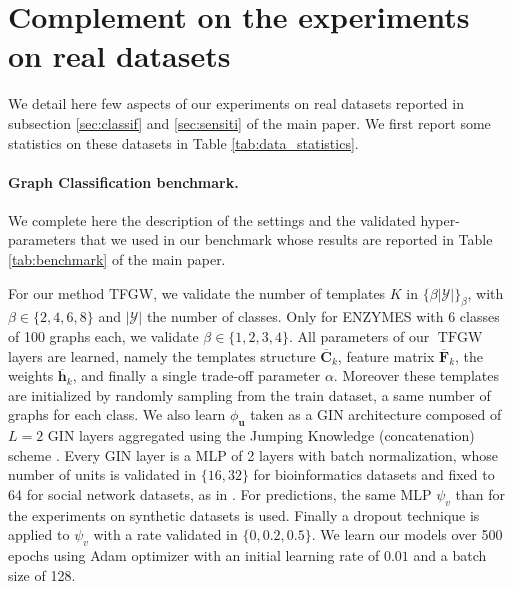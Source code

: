 \documentclass{article}
\def\vh{{\bm{h}}}
\def\vu{{\bm{u}}}
\def\mC{{\bm{C}}}
\def\mF{{\bm{F}}}
\newcommand{\TFGW}{\operatorname{TFGW}}
\begin{document}
{\section{Complement on the experiments on real datasets}
We detail here few aspects of our experiments on real datasets reported in subsection \ref{sec:classif} and \ref{sec:sensiti} of the main paper. We first report some statistics on these datasets in Table \ref{tab:data_statistics}. 

\paragraph{Graph Classification benchmark.} We complete here the description of the settings and the validated hyper-parameters that we used in our benchmark whose results are reported in Table \ref{tab:benchmark} of the main paper.

For our method TFGW, we validate the number of templates $K$ in $\{\beta |\mathcal{Y}|\}_\beta$, with $\beta \in \{2,4,6,8\}$ and $|\mathcal{Y}|$ the number of classes. Only for ENZYMES with 6 classes of 100 graphs each, we validate $\beta \in \{1, 2, 3, 4\}$.
All parameters of our $\TFGW$ layers are learned, namely the templates structure $\overline{\mC}_k$, feature matrix $\overline{\mF}_k$, the weights $\overline{\vh}_k$, and finally a single trade-off parameter $\alpha$. Moreover these templates are initialized by randomly sampling from the train dataset, a same number of graphs for each class. We also learn $\phi_\vu$ taken as a GIN architecture
\cite{xu2018powerful} composed of $L=2$ GIN layers aggregated using the Jumping Knowledge (concatenation) scheme \cite{xu2018representation}. Every GIN layer is a MLP of 2 layers with batch normalization, whose number of units is validated in $\{16, 32\}$ for bioinformatics datasets and fixed to 64 for social network datasets, as in \cite{xu2018powerful}. For predictions, the same MLP $\psi_v$ than for the experiments on synthetic datasets is used. Finally a dropout technique is applied to $\psi_v$ with a rate validated in $\{0, 0.2, 0.5\}$. We learn our models over 500 epochs using Adam optimizer with an initial learning rate of $0.01$ and a batch size of 128.

}
\end{document}
